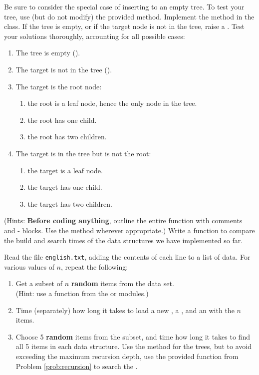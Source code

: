 Be sure to consider the special case of inserting to an empty tree.
To test your tree, use (but do not modify) the provided  method.
Implement the  method in the  class.
If the tree is empty, or if the target node is not in the tree, raise a .
Test your solutions thoroughly, accounting for all possible cases:
\begin{enumerate}
\item The tree is empty ().
\item The target is not in the tree ().
\item The target is the root node:
	\begin{enumerate}
	\item the root is a leaf node, hence the only node in the tree.
	\item the root has one child.
	\item the root has two children.
	\end{enumerate}
\item The target is in the tree but is not the root:
	\begin{enumerate}
	\item the target is a leaf node.
	\item the target has one child.
	\item the target has two children.
	\end{enumerate}
\end{enumerate}
(Hints: \textbf{Before coding anything}, outline the entire function with comments and - blocks.
Use the  method wherever appropriate.)
Write a function to compare the build and search times of the data structures we have implemented so far.

Read the file \texttt{english.txt}, adding the contents of each line to a list of data.
For various values of $n$, repeat the following:
%
\begin{enumerate}
\item Get a subset of $n$ \textbf{random} items from the data set.
\\(Hint: use a function from the  or  modules.)
\item Time (separately) how long it takes to load a new , a , and an  with the $n$ items.
\item Choose 5 \textbf{random} items from the subset, and time how long it takes to find all 5 items in each data structure.
Use the  method for the trees, but to avoid exceeding the maximum recursion depth, use the provided  function from Problem \ref{prob:recursion} to search the .
\end{enumerate}

